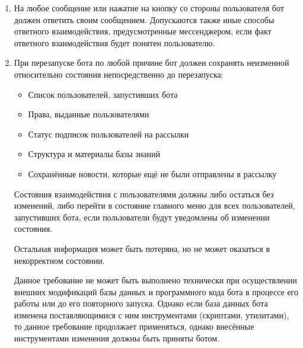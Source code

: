     \begin{enumerate}
        \item
            На любое сообщение или нажатие на кнопку со стороны пользователя бот должен ответить
            своим сообщением. Допускаются также иные способы ответного взаимодействия, предусмотренные
            мессенджером, если факт ответного взаимодействия будет понятен пользователю.
        \item
            При перезапуске бота по любой причине бот должен сохранять неизменной относительно
            состояния непосредственно до перезапуска:
            \begin{itemize}
                \item
                    Список пользователей, запустивших бота
                \item
                    Права, выданные пользователями
                \item
                    Статус подписок пользователей на рассылки
                \item
                    Структура и материалы базы знаний
                \item
                    Сохранённые новости, которые ещё не были отправлены в рассылку
            \end{itemize}

            Состояния взаимодействия с пользователями должны либо остаться без изменений, либо перейти
            в состояние главного меню для всех пользователей, запустивших бота, если
            пользователи будут уведомлены об изменении состояния.

            Остальная информация может быть потеряна, но не может оказаться в некорректном состоянии.

            Данное требование не может быть выполнено технически при осуществлении внешних модификаций базы
            данных и программного кода бота в процессе его работы или до его повторного запуска.
            Однако если база данных бота изменена поставляющимися с ним инструментами (скриптами, утилитами),
            то данное требование продолжает применяться, однако внесённые инструментами изменения должны
            быть приняты ботом.


\end{enumerate}
